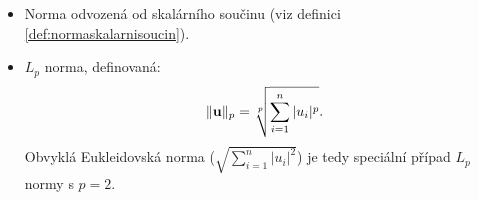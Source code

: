 \begin{remark}
    \leavevmode
    \begin{itemize}
        \item Norma odvozená od skalárního součinu (viz definici 
            \ref{def:normaskalarnisoucin}).
        \item $L_p$ norma, definovaná: $$ \|\mathbf{u}\|_p = \sqrt[p]{\sum_{i=1}^n
            |u_i|^p}.$$
            Obvyklá Eukleidovská norma ($\sqrt{\sum_{i=1}^n |u_i|^2}$) je tedy
            speciální případ $L_p$ normy s $p = 2$.
    \end{itemize}
\end{remark}
